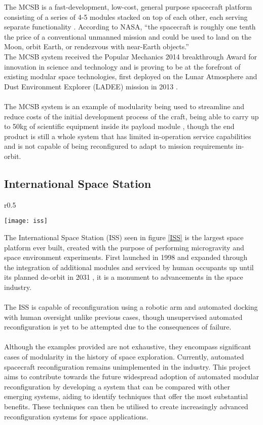 The MCSB is a fast-development, low-cost, general purpose spacecraft platform consisting of a series of 4-5 modules stacked on top of each other, each serving separate functionality \cite{tietz2009multi}. According to NASA, “the spacecraft is roughly one tenth the price of a conventional unmanned mission and could be used to land on the Moon, orbit Earth, or rendezvous with near-Earth objects.” \cite{MCSBPost} 
\\
The MCSB system received the Popular Mechanics 2014 breakthrough Award for innovation in science and technology \cite{MCSBaward} and is proving to be at the forefront of existing modular space technologies, first deployed on the Lunar Atmosphere and Dust Environment Explorer (LADEE) mission in 2013 \cite{7118961}.
\\\\
The MCSB system is an example of modularity being used to streamline and reduce costs of the initial development process of the craft, being able to carry up to 50kg of scientific equipment inside its payload module \cite{tietz2009multi}, though the end product is still a whole system that has limited in-operation service capabilities and is not capable of being reconfigured to adapt to mission requirements in-orbit.
\subsection{International Space Station}
\begin{wrapfigure}{r}{0.5\textwidth}
\centering
\vspace{-\baselineskip}

\texttt{[image: iss]}
\caption{The ISS pictured from the SpaceX Crew Dragon (Dec. 8, 2021). Image from \cite{issImage}}
\label{ISS}
\end{wrapfigure}
The International Space Station (ISS) seen in figure \ref{ISS} is the largest space platform ever built, created with the purpose of performing microgravity and space environment experiments. First launched in 1998\cite{shaevich2003results} and expanded through the integration of additional modules and serviced by human occupants up until its planned de-orbit in 2031 \cite{ISSdecomission}, it is a monument to advancements in the space industry.
\\\\
The ISS is capable of reconfiguration using a robotic arm and automated docking with human oversight \cite{post2019knowledge} unlike previous cases, though unsupervised automated reconfiguration is yet to be attempted due to the consequences of failure.
\\\\
Although the examples provided are not exhaustive, they encompass significant cases of modularity in the history of space exploration. Currently, automated spacecraft reconfiguration remains unimplemented in the industry. This project aims to contribute towards the future widespread adoption of automated modular reconfiguration by developing a system that can be compared with other emerging systems, aiding to identify techniques that offer the most substantial benefits. These techniques can then be utilised to create increasingly advanced reconfiguration systems for space applications.